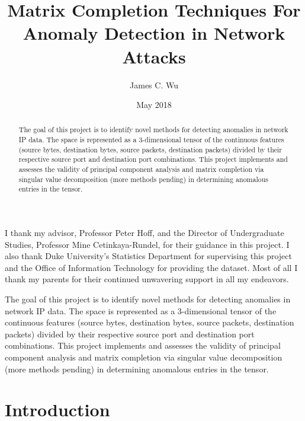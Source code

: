 \documentclass[12pt,twoside]{dukestatscithesis}
\title{Matrix Completion Techniques For Anomaly Detection in Network Attacks}
\author{James C. Wu}
\date{May 2018}
\theoremstyle{definition}
\theoremstyle{definition}
\theoremstyle{definition}
\theoremstyle{remark}
\begin{document}
  \maketitle

\frontmatter %
\pagestyle{empty} %
  \begin{acknowledgements}
    I thank my advisor, Professor Peter Hoff, and the Director of
    Undergraduate Studies, Professor Mine Cetinkaya-Rundel, for their
    guidance in this project. I also thank Duke University's Statistics
    Department for supervising this project and the Office of Information
    Technology for providing the dataset. Most of all I thank my parents for
    their continued unwavering support in all my endeavors.
  \end{acknowledgements}

  \hypersetup{linkcolor=black}
  \setcounter{tocdepth}{2}
  \tableofcontents


  \begin{abstract}
    The goal of this project is to identify novel methods for detecting
    anomalies in network IP data. The space is represented as a
    3-dimensional tensor of the continuous features (source bytes,
    destination bytes, source packets, destination packets) divided by their
    respective source port and destination port combinations. This project
    implements and assesses the validity of principal component analysis and
    matrix completion via singular value decomposition (more methods
    pending) in determining anomalous entries in the tensor.
  \end{abstract}

\mainmatter %
\pagestyle{fancyplain} %

The goal of this project is to identify novel methods for detecting
anomalies in network IP data. The space is represented as a
3-dimensional tensor of the continuous features (source bytes,
destination bytes, source packets, destination packets) divided by their
respective source port and destination port combinations. This project
implements and assesses the validity of principal component analysis and
matrix completion via singular value decomposition (more methods
pending) in determining anomalous entries in the tensor.

\chapter{Introduction}\label{introduction}
\end{document}
